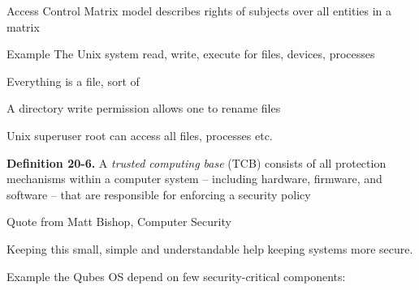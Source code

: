 \documentclass[Screen16to9,17pt]{foils}
\begin{document}
\begin{list1}
\item Access Control Matrix model describes rights of subjects over all entities in a matrix
\item Example The Unix system read, write, execute for files, devices, processes
\item Everything is a file, sort of
\item A directory write permission allows one to rename files
\item Unix superuser root can access all files, processes etc.
\end{list1}




{\bf Definition 20-6.} A \emph{trusted computing base} (TCB) consists of all protection mechanisms within a computer system -- including hardware, firmware, and software -- that are responsible for enforcing a security policy

Quote from Matt Bishop, Computer Security

Keeping this small, simple and understandable help keeping systems more secure.

Example the Qubes OS depend on few security-critical components:\\





\slidenext
\end{document}
